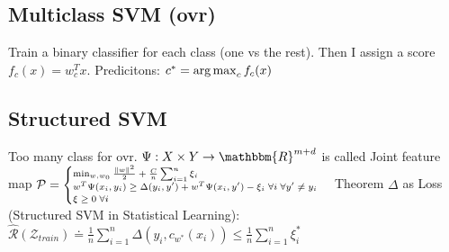 \subsection*{Multiclass SVM (ovr)}
Train a binary classifier for each class (one vs the rest). Then I assign a score $f_c(x)=w_c^Tx$. Predicitons: $c^*=\operatorname*{arg\,max}_c f_c(x)$
\subsection*{Structured SVM}
Too many class for ovr. $\Psi: X \times Y \rightarrow \mathbbm{R}^{m+d}$ is called Joint feature map
\( 
	\mathcal{P}= \scriptsize
\begin{cases}
	\min_{w,w_0} \frac{\left\lVert w\right\rVert^2}{2} + \frac{C}{n}\sum_{i=1}^n \xi_i\\
	w^T\Psi(x_i,y_i)\geq \Delta(y_i,y') + w^T\Psi(x_i,y') -\xi_i\;\forall i\; \forall y' \neq y_i\\
	\xi \geq 0 \;\forall i\\
\end{cases}
\)
Theorem \(\Delta\) as Loss (Structured SVM in Statistical Learning):\\
$\hat{\mathcal{R}}(\mathcal{Z}_{train})\doteq \frac{1}{n} \sum_{i=1}^n \Delta(y_i, c_{w^*}(x_i)) \leq \frac{1}{n}\sum_{i=1}^n \xi^*_i$







